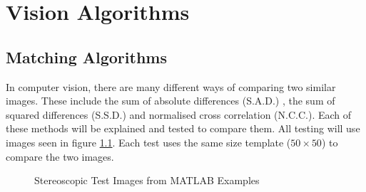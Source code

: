 \chapter{Vision Algorithms} \label{Chapter:InvestigationVision}

\section{Matching Algorithms}\label{Section:Comparison}
In computer vision, there are many different ways of comparing two similar images. These include the sum of absolute differences (S.A.D.) \citep{Hamzah:DistanceDetection}, the sum of squared differences (S.S.D.)\citep{Mrovlje:Distance_Stereoscopic} and  normalised cross correlation (N.C.C.)\citep{zhao2006image}. Each of these methods will be explained and tested to compare them. All testing will use images seen in figure \ref{fig:StereoTest}. Each test uses the same size template ($50\times50$) to compare the two images. 

\begin{figure}
\centering
{}
\caption{Stereoscopic Test Images from MATLAB Examples}
\label{fig:StereoTest}
\end{figure}



